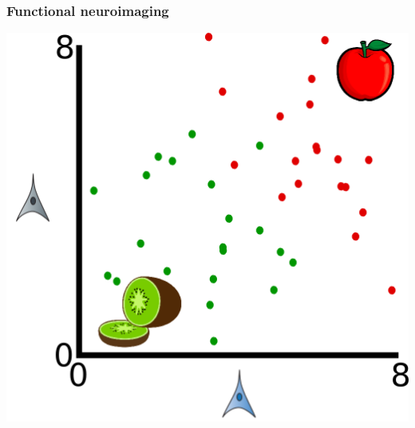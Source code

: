 \documentclass{beamer}
\begin{document}
\begin{frame}
\frametitle{Functional neuroimaging}
\begin{center}
\includegraphics[scale = 0.3]{intro3.png}
\end{center}
\end{frame}
\end{document}

